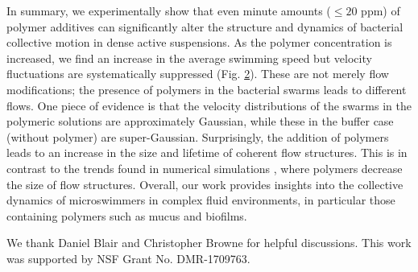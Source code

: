 \documentclass[aps,prl,floatfix,footinbib,twocolumn,superscriptaddress]{revtex4-1}
\begin{document}
In summary, we experimentally show that even minute amounts ($\le20$ ppm) of polymer additives can significantly alter the structure and dynamics of bacterial collective motion in dense active suspensions. As the polymer concentration is increased, we find an increase in the average swimming speed but velocity fluctuations are systematically suppressed (Fig. \hyperref[fig2]{2}). These are not merely flow modifications; the presence of polymers in the bacterial swarms leads to different flows. One piece of evidence is that the velocity distributions of the swarms in the polymeric solutions are approximately Gaussian, while these in the buffer case (without polymer) are super-Gaussian. Surprisingly, the addition of polymers leads to an increase in the size and lifetime of coherent flow structures. This is in contrast to the trends found in numerical simulations \cite{Li_PRL_2016, Underhill_JNNFM_2014}, where polymers decrease the size of flow structures. Overall, our work provides insights into the collective dynamics of microswimmers in complex fluid environments, in particular those containing polymers such as mucus and biofilms.

\vspace{+1ex}

We thank Daniel Blair and Christopher Browne for helpful discussions. This work was supported by NSF Grant No. DMR-1709763.



 
\end{document}
